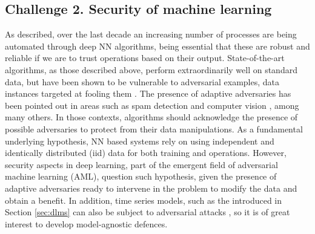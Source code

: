


\subsection{Challenge 2. Security of machine learning}
\label{sec:chall2}

As described, over the last decade
an increasing number of processes are being automated through 
deep NN algorithms, being 
essential that these are robust and reliable
if we are to
trust operations based on their output. State-of-the-art
algorithms, as those described above, perform extraordinarily well on standard data,  but have been
shown to be vulnerable to adversarial examples, data instances targeted at
fooling them \parencite{goodfellow2014explaining}.
The presence of adaptive adversaries has
been pointed out in areas such as spam detection \parencite{zeager2017adversarial}
and computer vision \parencite{goodfellow2014explaining}, among many others. 
In those contexts, algorithms should acknowledge the presence of possible adversaries
to protect from their data manipulations.
As a fundamental underlying hypothesis, NN
based systems rely on using 
independent and identically distributed (iid) data for both training and operations. However, security aspects in deep
learning, part of the emergent field of
adversarial machine learning (AML),
question such hypothesis, given the
presence of adaptive adversaries ready to  intervene in the problem 
to modify the data and obtain a benefit. In addition, time series models, such as the introduced in Section \ref{sec:dlms} can also be subject to adversarial attacks \parencite{9063523,10.5555/3016100.3016102}, so it is of great interest to develop model-agnostic defences.

